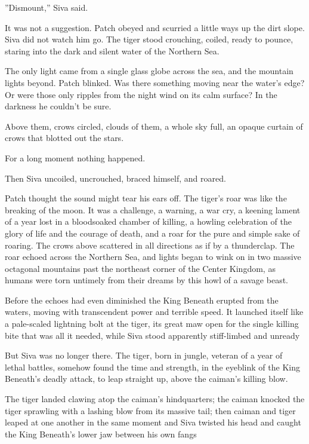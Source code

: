 \documentclass[11pt]{article}
\begin{document}
 ''Dismount,'' Siva said.\par
 It was not a suggestion. Patch obeyed and scurried a little ways up the dirt slope. Siva did not watch him go. The tiger stood crouching, coiled, ready to pounce, staring into the dark and silent water of the Northern Sea.\par
The only light came from a single glass globe across the sea, and the mountain lights beyond. Patch blinked. Was there something moving near the water's edge? Or were those only ripples from the night wind on its calm surface? In the darkness he couldn't be sure.\par
Above them, crows circled, clouds of them, a whole sky full, an opaque curtain of crows that blotted out the stars.\par
 For a long moment nothing happened.\par
 Then Siva uncoiled, uncrouched, braced himself, and roared.\par
 Patch thought the sound might tear his ears off. The tiger's roar was like the breaking of the moon. It was a challenge, a warning, a war cry, a keening lament of a year lost in a bloodsoaked chamber of killing, a howling celebration of the glory of life and the courage of death, and a roar for the pure and simple sake of roaring. The crows above scattered in all directions as if by a thunderclap. The roar echoed across the Northern Sea, and lights began to wink on in two massive octagonal mountains past the northeast corner of the Center Kingdom, as humans were torn untimely from their dreams by this howl of a savage beast.\par
 Before the echoes had even diminished the King Beneath erupted from the waters, moving with transcendent power and terrible speed. It launched itself like a pale-scaled lightning bolt at the tiger, its great maw open for the single killing bite that was all it needed, while Siva stood apparently stiff-limbed and unready %
\par
But Siva was no longer there. The tiger, born in jungle, veteran of a year of lethal battles, somehow found the time and strength, in the eyeblink of the King Beneath's deadly attack, to leap straight up, above the caiman's killing blow.\par
The tiger landed clawing atop the caiman's hindquarters; the caiman knocked the tiger sprawling with a lashing blow from its massive tail; then caiman and tiger leaped at one another in the same moment %
 and Siva twisted his head and caught the King Beneath's lower jaw between his own fangs %
\end{document}
